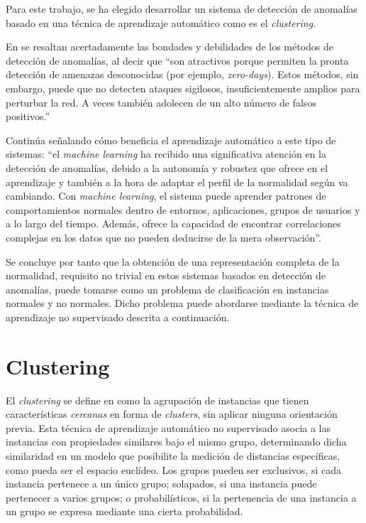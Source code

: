 Para este trabajo, se ha elegido desarrollar un sistema de detección de anomalías basado en una técnica de aprendizaje automático como es el \emph{clustering}.

En \cite{Alconzo_2019} se resaltan acertadamente las bondades y debilidades de los métodos de detección de anomalías, al decir que
``son atractivos porque permiten la pronta detección de amenazas desconocidas (por ejemplo, \emph{zero-days}).
Estos métodos, sin embargo, puede que no detecten ataques sigilosos, insuficientemente amplios para perturbar la red.
A veces también adolecen de un alto número de falsos positivos.''

Continúa señalando cómo beneficia el aprendizaje automático a este tipo de sistemas: ``el \emph{machine learning} ha recibido una significativa atención en la detección de anomalías, debido a
la autonomía y robustez que ofrece en el aprendizaje y también a la hora de adaptar el perfil de la normalidad según va cambiando.
Con \emph{machine learning}, el sistema puede aprender patrones de comportamientos normales dentro de entornos, aplicaciones, grupos de usuarios y a lo largo del tiempo.
Además, ofrece la capacidad de encontrar correlaciones complejas en los datos que no pueden deducirse de la mera observación''.

Se concluye por tanto que la obtención de una representación completa de la normalidad, requisito no trivial en estos sistemas basados en detección de anomalías,
puede tomarse como un problema de clasificación en instancias normales y no normales.
Dicho problema puede abordarse mediante la técnica de aprendizaje no supervisado descrita a continuación.

\section{Clustering}\label{clustering}

El \emph{clustering} se define en \cite{NA08} como la agrupación de instancias que tienen características \emph{cercanas} en forma de \emph{clusters}, sin aplicar ninguna orientación previa.
Esta técnica de aprendizaje automático no supervisado asocia a las instancias con propiedades similares bajo el mismo grupo,
determinando dicha similaridad en un modelo que posibilite la medición de distancias específicas, como pueda ser el espacio euclídeo.
Los grupos pueden ser exclusivos, si cada instancia pertenece a un único grupo;
solapados, si una instancia puede pertenecer a varios grupos;
o probabilísticos, si la pertenencia de una instancia a un grupo se expresa mediante una cierta probabilidad.

